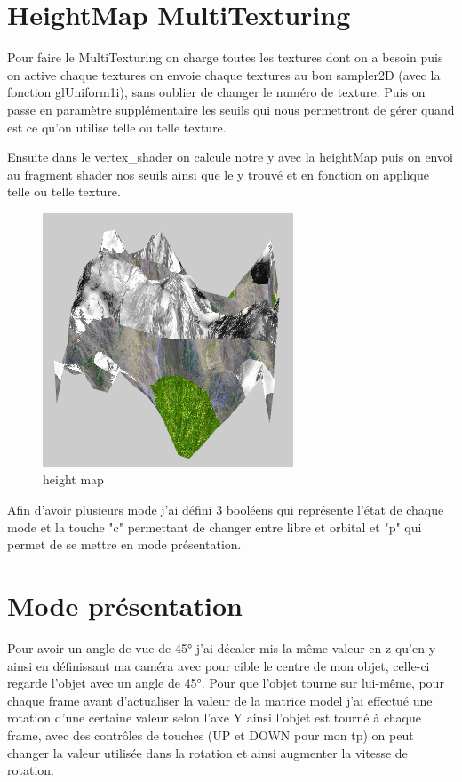 \documentclass{article}
\begin{document}
\newpage
\section{HeightMap MultiTexturing}

Pour faire le MultiTexturing on charge toutes les textures dont on a besoin puis on active chaque textures on envoie chaque textures au bon sampler2D (avec la fonction glUniform1i), sans oublier de changer le numéro de texture.
Puis on passe en paramètre supplémentaire les seuils qui nous permettront de gérer quand est ce qu'on utilise telle ou telle texture.
 
Ensuite dans le vertex\_shader on calcule notre y avec la heightMap puis on envoi au fragment shader nos seuils ainsi que le y trouvé et en fonction on applique telle ou telle texture.

\begin{figure}[h!]
\centerline{ \includegraphics[scale=1]{./rendus/heightmpamultitext.png} }
\caption{height map} 
\end{figure}

\newpage
Afin d'avoir plusieurs mode j'ai défini 3 booléens qui représente l'état de chaque mode et la touche "c" permettant de changer entre libre et orbital et "p" qui permet de se mettre en mode présentation. 

\section{Mode présentation}
Pour avoir un angle de vue de 45° j'ai décaler mis la même valeur en z qu'en y ainsi en définissant ma caméra avec pour cible le centre de mon objet, celle-ci regarde l'objet avec un angle de 45°.
Pour que l'objet tourne sur lui-même, pour chaque frame avant d'actualiser la valeur de la matrice model j'ai effectué une rotation d'une certaine valeur selon l'axe Y ainsi l'objet est tourné à chaque frame, avec des contrôles de touches (UP et DOWN pour mon tp) on peut changer la valeur utilisée dans la rotation et ainsi augmenter la vitesse de rotation.
\end{document}
